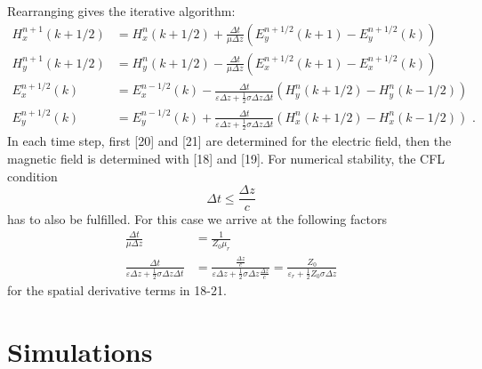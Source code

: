 \documentclass[]{report}
\begin{document}
Rearranging gives the iterative algorithm:
\begin{align}
	H_x^{n+1}(k+1/2) &= H_x^{n}(k+1/2) + \frac{\Delta t}{\mu \Delta z}\left( E_y^{n+1/2}(k+1)-E_y^{n+1/2}(k) \right) \\
	H_y^{n+1}(k+1/2) &= H_y^{n}(k+1/2) - \frac{\Delta t}{\mu \Delta z}\left( E_x^{n+1/2}(k+1)-E_x^{n+1/2}(k) \right) \\
	E_x^{n+1/2}(k) &= E_x^{n-1/2}(k) - \frac{\Delta t}{\varepsilon \Delta z + \frac{1}{2}\sigma \Delta z \Delta t} \left( H_y^{n}(k+1/2)-H_y^{n}(k-1/2) \right) \\
	E_y^{n+1/2}(k) &= E_y^{n-1/2}(k) + \frac{\Delta t}{\varepsilon \Delta z + \frac{1}{2}\sigma \Delta z \Delta t} \left( H_x^{n}(k+1/2)-H_x^{n}(k-1/2) \right) \text{ .}
\end{align}
In each time step, first [20] and [21] are determined for the electric field, then the magnetic field is determined with [18] and [19]. For numerical stability, the CFL condition
\begin{equation}
	\Delta t \leq \frac{\Delta z}{c}
\end{equation}
has to also be fulfilled. For this case we arrive at the following factors
\begin{align}
	\frac{\Delta t}{\mu \Delta z} &= \frac{1}{Z_0 \mu_r} \\
	\frac{\Delta t}{\varepsilon \Delta z + \frac{1}{2}\sigma \Delta z \Delta t} &= \frac{\frac{\Delta z}{c}}{\varepsilon \Delta z + \frac{1}{2}\sigma \Delta z \frac{\Delta z}{c}} = \frac{Z_0}{\varepsilon_r + \frac{1}{2} Z_0 \sigma \Delta z}
\end{align}
for the spatial derivative terms in 18-21.


\section{Simulations}
\end{document}
